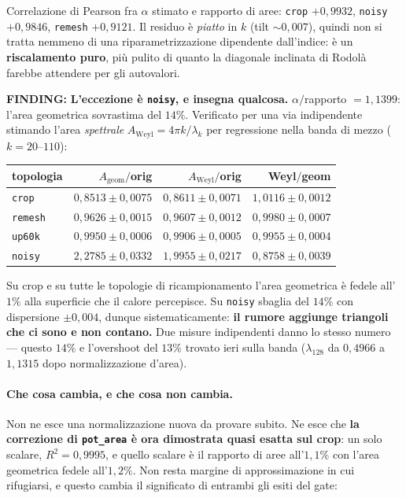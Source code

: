 \documentclass[11pt,a4paper]{article}
\newcommand{\finding}[1]{\textcolor{finding}{\textbf{FINDING:}} #1}
\begin{document}
Correlazione di Pearson fra $\alpha$ stimato e rapporto di aree: \texttt{crop} $+0{,}9932$,
\texttt{noisy} $+0{,}9846$, \texttt{remesh} $+0{,}9121$. Il residuo \`e \emph{piatto} in $k$
(tilt $\sim 0{,}007$), quindi non si tratta nemmeno di una riparametrizzazione dipendente
dall'indice: \`e un \textbf{riscalamento puro}, pi\`u pulito di quanto la diagonale inclinata di
Rodol\`a farebbe attendere per gli autovalori.

\finding{\textbf{L'eccezione \`e \texttt{noisy}, e insegna qualcosa.} $\alpha/$rapporto
$= 1{,}1399$: l'area geometrica sovrastima del $14\%$. Verificato per una via indipendente
stimando l'area \emph{spettrale} $A_{\mathrm{Weyl}} = 4\pi k/\lambda_k$ per regressione nella
banda di mezzo ($k = 20$--$110$):}

\begin{center}\small
\begin{tabular}{lrrr}
\toprule
topologia & $A_{\mathrm{geom}}/$orig & $A_{\mathrm{Weyl}}/$orig & Weyl$/$geom \\
\midrule
\texttt{crop}   & $0{,}8513 \pm 0{,}0075$ & $0{,}8611 \pm 0{,}0071$ & $1{,}0116 \pm 0{,}0012$ \\
\texttt{remesh} & $0{,}9626 \pm 0{,}0015$ & $0{,}9607 \pm 0{,}0012$ & $0{,}9980 \pm 0{,}0007$ \\
\texttt{up60k}  & $0{,}9950 \pm 0{,}0006$ & $0{,}9906 \pm 0{,}0005$ & $0{,}9955 \pm 0{,}0004$ \\
\texttt{noisy}  & $2{,}2785 \pm 0{,}0332$ & $1{,}9955 \pm 0{,}0217$ & $0{,}8758 \pm 0{,}0039$ \\
\bottomrule
\end{tabular}
\end{center}

Su crop e su tutte le topologie di ricampionamento l'area geometrica \`e fedele all'$1\%$ alla
superficie che il calore percepisce. Su \texttt{noisy} sbaglia del $14\%$ con dispersione
$\pm 0{,}004$, dunque sistematicamente: \textbf{il rumore aggiunge triangoli che ci sono e non
contano.} Due misure indipendenti danno lo stesso numero --- questo $14\%$ e l'overshoot del
$13\%$ trovato ieri sulla banda ($\lambda_{128}$ da $0{,}4966$ a $1{,}1315$ dopo normalizzazione
d'area).

\paragraph{Che cosa cambia, e che cosa non cambia.} Non ne esce una normalizzazione nuova da
provare subito. Ne esce che \textbf{la correzione di \texttt{pot\_area} \`e ora dimostrata quasi
esatta sul crop}: un solo scalare, $R^2 = 0{,}9995$, e quello scalare \`e il rapporto di aree
all'$1{,}1\%$ con l'area geometrica fedele all'$1{,}2\%$. Non resta margine di approssimazione in
cui rifugiarsi, e questo cambia il significato di entrambi gli esiti del gate:
\end{document}
